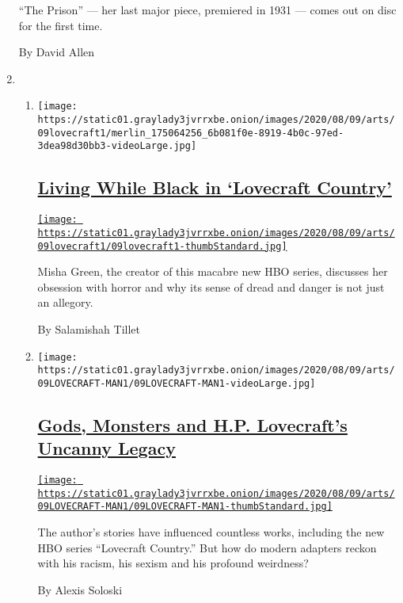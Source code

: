 \begin{enumerate}
  ``The Prison'' --- her last major piece, premiered in 1931 --- comes
  out on disc for the first time.

  By David Allen
\item
  \begin{enumerate}
  \def\labelenumii{\arabic{enumii}.}
  \item
    \texttt{[image: https://static01.graylady3jvrrxbe.onion/images/2020/08/09/arts/09lovecraft1/merlin\_175064256\_6b081f0e-8919-4b0c-97ed-3dea98d30bb3-videoLarge.jpg]}

    \hypertarget{living-while-black-in-lovecraft-country}{%
    \subsection{\texorpdfstring{\href{/2020/08/07/arts/television/living-while-black-in-lovecraft-country.html}{Living
    While Black in `Lovecraft
    Country'}}{Living While Black in `Lovecraft Country'}}\label{living-while-black-in-lovecraft-country}}

    \href{/2020/08/07/arts/television/living-while-black-in-lovecraft-country.html}{\texttt{[image: https://static01.graylady3jvrrxbe.onion/images/2020/08/09/arts/09lovecraft1/09lovecraft1-thumbStandard.jpg]}}

    Misha Green, the creator of this macabre new HBO series, discusses
    her obsession with horror and why its sense of dread and danger is
    not just an allegory.

    By Salamishah Tillet
  \item
    \texttt{[image: https://static01.graylady3jvrrxbe.onion/images/2020/08/09/arts/09LOVECRAFT-MAN1/09LOVECRAFT-MAN1-videoLarge.jpg]}

    \hypertarget{gods-monsters-and-hp-lovecrafts-uncanny-legacy}{%
    \subsection{\texorpdfstring{\href{/2020/08/07/arts/television/hp-lovecraft.html}{Gods,
    Monsters and H.P. Lovecraft's Uncanny
    Legacy}}{Gods, Monsters and H.P. Lovecraft's Uncanny Legacy}}\label{gods-monsters-and-hp-lovecrafts-uncanny-legacy}}

    \href{/2020/08/07/arts/television/hp-lovecraft.html}{\texttt{[image: https://static01.graylady3jvrrxbe.onion/images/2020/08/09/arts/09LOVECRAFT-MAN1/09LOVECRAFT-MAN1-thumbStandard.jpg]}}

    The author's stories have influenced countless works, including the
    new HBO series ``Lovecraft Country.'' But how do modern adapters
    reckon with his racism, his sexism and his profound weirdness?

    By Alexis Soloski
  \end{enumerate}
\end{enumerate}

